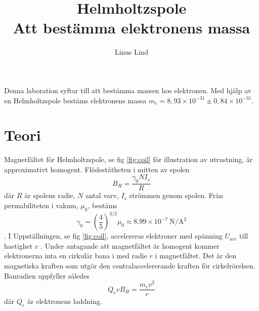 \documentclass{article}
\title{Helmholtzspole \\ Att bestämma elektronens massa}
\author{Linus Lind}
\begin{document}
\maketitle
Denna laboration syftar till att bestämma massen hos elektronen. Med hjälp av en Helmholtzspole bestäms elektronens massa $m_e = 8,93 \times 10^{−31} \pm 0,84 \times10^{−31}$.

\section*{Teori}
Magnetfältet för Helmholtzspole, se fig \ref{fig:coil} för illustration av utrustning, är approximativt homogent. Flödestätheten i mitten av spolen \cite{anderson1999design}
\begin{equation}
    B_H = \frac{\gamma_0 N I_s}{R}
\end{equation}
där $R$ är spolens radie, $N$ antal varv, $I_s$ strömmen genom spolen. Från permabiliteten i vakum, $\mu_0$, bestäms   
\begin{equation}
\gamma_0 = \left( \frac{4}{5} \right)^{3/2} \mu_0  \approx 8.99 \times 10^{-7} \: \mathrm{N/A^2}    
\end{equation}.
I Uppställningen, se fig \ref{fig:coil}, accelereras elektroner med spänning $U_{acc}$ till hastighet $v$ . Under antagande att magnetfältet är homogent  kommer elektronerna inta en cirkulär bana i med radie $r$ i magnetfältet. Det är den magnetiska kraften som utgör den centralaccelererande kraften för cirkelrörelsen. Banradien uppfyller således
\begin{equation}
Q_e v B_H = \frac{ m_e v^2}{r}
\end{equation}
där $Q_e$ är elektronens laddning. 
 
\end{document}
